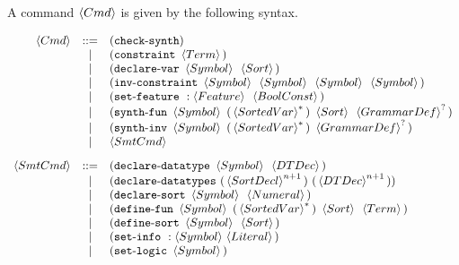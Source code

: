 \documentclass[english,a4paper,10pt]{article}
\begin{document}
A command $\left\langle Cmd\right\rangle$ is given by the following syntax.

\[
\begin{array}{rcl}
\cmd 
 & ::= & \paren{\checksynthkwd} \\
 & | & \paren{\constraintkwd\mbox{ }\term} \\
 & | & \paren{\vardeclkwd\mbox{ }\symbol\mbox{ }\sortexpr}\\ 
 & | & \paren{\constraintinvkwd\mbox{ }\symbol\mbox{ }\symbol\mbox{ }\symbol\mbox{ }\symbol} \\
 & | & \paren{\setfeaturekwd\mbox{ }:\feature\mbox{ }\boolconst} \\
 & | & \paren{\synthfunkwd\mbox{ }\symbol\mbox{ }\paren{\kstar{\sortedvar}}\mbox{ }\sortexpr\mbox{ }\koption{\grammardef}}\\
 & | & \paren{\synthinvkwd\mbox{ }\symbol\mbox{ }\paren{\kstar{\sortedvar}}\mbox{ }\koption{\grammardef}} \\
 & | & \smtcmd \\[2ex]
\smtcmd 
 & ::= &\paren{\dtdeclkwd\mbox{ }\symbol\mbox{ }\dtdec} \\
 & | & \paren{\dtsdeclkwd\mbox{ }\paren{\kstarn{\sortdecl}{n+1} }\mbox{ }\paren{\kstarn{\dtdec}{n+1}}} \\
 & | & \paren{\sortdeclkwd\mbox{ }\symbol\mbox{ }\intconst} \\
 & | & \paren{\fundefkwd\mbox{ }\symbol\mbox{ }\paren{\kstar{\sortedvar}}\mbox{ }\sortexpr\mbox{ }\term} \\  %
 & | & \paren{\sortdefkwd\mbox{ }\symbol\mbox{ }\sortexpr} \\
 & | & \paren{\setinfokwd\mbox{ }:\symbol{ }\literal} \\
 & | & \paren{\setlogickwd\mbox{ }\symbol} \\

\end{array}\]
\end{document}
